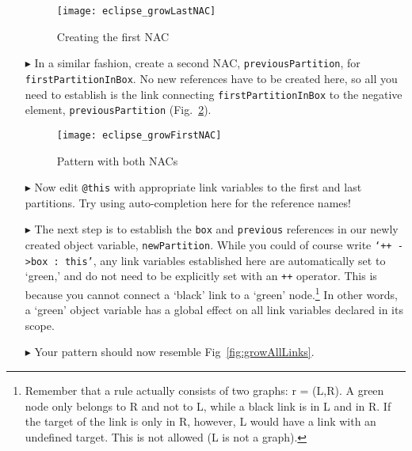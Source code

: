 \begin{itemize}
\begin{figure}[htbp]
\begin{center}
  \texttt{[image: eclipse\_growLastNAC]}
  \caption{Creating the first NAC}
  \label{fig:firstNAC}
\end{center}
\end{figure}

\vspace{0.5cm}

\item[$\blacktriangleright$] In a similar fashion, create a second NAC, \texttt{previousPartition}, for \texttt{firstPartitionInBox}. No new references have to
be created here, so all you need to establish is the link connecting \texttt{firstPartitionInBox} to the negative element, \texttt{previousPartition}
(Fig.~\ref{fig:growPatt}).

\begin{figure}[htp]
\begin{center}
  \texttt{[image: eclipse\_growFirstNAC]}
  \caption{Pattern with both NACs}
  \label{fig:growPatt}
\end{center}
\end{figure}

\item[$\blacktriangleright$] Now edit \texttt{@this} with appropriate link variables to the first and last partitions. Try using auto-completion here for the
reference names!

\newpage

\item[$\blacktriangleright$] The next step is to establish the \texttt{box} and \texttt{previous} references in our newly created object variable,
\texttt{newPartition}. While you could of course write \texttt{`++ ->box : this'}, any link variables established here are automatically set to `green,' and do
not need to be explicitly set with an \texttt{++} operator. This is because you cannot connect a `black' link to a `green' node.\footnote{Remember that a rule
actually consists of two graphs: r = (L,R). A green node only belongs to R and not to L, while a black link is in L and in R. If the target of the link is only
in R, however, L would have a link with an undefined target. This is not allowed (L is not a graph).} In other words, a `green' object variable has a global
effect on all link variables declared in its scope.

\item[$\blacktriangleright$] Your pattern should now resemble Fig~\ref{fig:growAllLinks}. 


\end{itemize}
